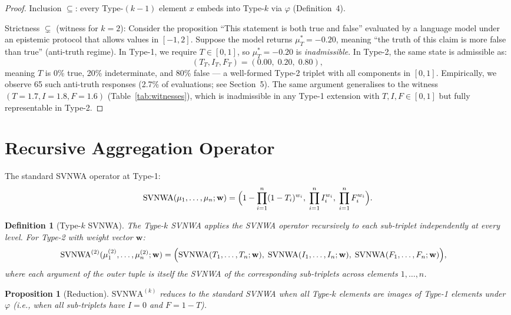 \documentclass[10pt,a4paper]{article}
\newtheorem{definition}{Definition}
\newtheorem{proposition}{Proposition}
\begin{document}
\begin{proof}
Inclusion $\subseteq$: every Type-$(k-1)$ element $x$
embeds into Type-$k$ via $\varphi$ (Definition~4).

Strictness $\subsetneq$ (witness for $k=2$):
Consider the proposition ``This statement is both true and
false'' evaluated by a language model under an epistemic
protocol that allows values in $[-1, 2]$.
Suppose the model returns
$\mu^*_T = -0.20$, meaning ``the truth of this claim is
more false than true'' (anti-truth regime).
In Type-1, we require $T \in [0,1]$, so $\mu^*_T = -0.20$
is \emph{inadmissible}.
In Type-2, the same state is admissible as:
\[
  (T_T, I_T, F_T) = (0.00,\; 0.20,\; 0.80),
\]
meaning $T$ is 0\% true, 20\% indeterminate, and 80\% false
— a well-formed Type-2 triplet with all components in
$[0,1]$.
Empirically, we observe 65 such anti-truth responses
(2.7\% of evaluations; see Section~5).
The same argument generalises to the witness
$(T=1.7, I=1.8, F=1.6)$ (Table~\ref{tab:witnesses}),
which is inadmissible in any Type-1 extension with
$T,I,F \in [0,1]$ but fully representable in Type-2.
\end{proof}

\section{Recursive Aggregation Operator}

The standard SVNWA operator \cite{wang2010svn} at Type-1:
\[
  \text{SVNWA}(\mu_1,\ldots,\mu_n;\mathbf{w}) =
  \Bigl(1-\prod_{i=1}^n (1-T_i)^{w_i},\;
  \prod_{i=1}^n I_i^{w_i},\;
  \prod_{i=1}^n F_i^{w_i}\Bigr).
\]

\begin{definition}[Type-$k$ SVNWA]
The \emph{Type-$k$ SVNWA} applies the SVNWA operator
recursively to each sub-triplet independently at every
level. For Type-2 with weight vector $\mathbf{w}$:
\begin{align}
  \text{SVNWA}^{(2)}(\mu^{(2)}_1,\ldots,\mu^{(2)}_n;\mathbf{w}) &=
  \Bigl(
    \text{SVNWA}(T_1,\ldots,T_n;\mathbf{w}),\;
    \text{SVNWA}(I_1,\ldots,I_n;\mathbf{w}),\;
    \text{SVNWA}(F_1,\ldots,F_n;\mathbf{w})
  \Bigr),
\end{align}
where each argument of the outer tuple is itself the
SVNWA of the corresponding sub-triplets across elements
$1,\ldots,n$.
\end{definition}

\begin{proposition}[Reduction]
$\text{SVNWA}^{(k)}$ reduces to the standard SVNWA when
all Type-$k$ elements are images of Type-1 elements under
$\varphi$ (i.e., when all sub-triplets have $I=0$ and
$F=1-T$).
\end{proposition}
\end{document}
